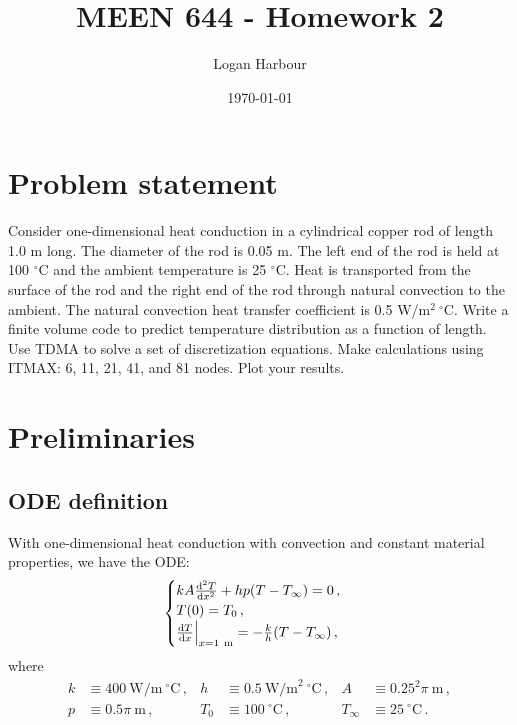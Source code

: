 \documentclass{article}
\newcommand{\pageTitle}{MEEN 644 - Homework 2}
\newcommand{\pageAuthor}{Logan Harbour}
\begin{document}
\title{\LARGE \textbf{\pageTitle} \vspace{-0.3cm}}
\author{\large \pageAuthor}
\date{\vspace{-0.6cm} \large \today \vspace{-0.4cm}}

\maketitle

\section*{Problem statement}

Consider one-dimensional heat conduction in a cylindrical copper rod of length 1.0 m long. The diameter of the rod is 0.05 m. The left end of the rod is held at 100 $^\circ$C and the ambient temperature is 25 $^\circ$C. Heat is transported from the surface of the rod and the right end of the rod through natural convection to the ambient. The natural convection heat transfer coefficient is 0.5 W/m$^2~^\circ$C. Write a finite volume code to predict temperature distribution as a function of length. Use TDMA to solve a set of discretization equations. Make calculations using ITMAX: 6, 11, 21, 41, and 81 nodes. Plot your results.

\section*{Preliminaries}

\subsection*{ODE definition}

With one-dimensional heat conduction with convection and constant material properties, we have the ODE:
\begin{equation}
	\begin{cases}
		kA \dv{^2T}{x^2} + h p (T - T_\infty) = 0\,,\\
		T(0) = T_0\,,\\
		\dv{T}{x} \Big|_{x = 1~\text{m}} = - \frac{k}{h} (T - T_\infty)\,,
	\end{cases}
\end{equation}
where
\begin{align*}
	k & \equiv 400~\text{W/m}~^\circ\text{C}\,, & h & \equiv 0.5~\text{W/m}^2~^\circ\text{C}\,, & A & \equiv 0.25^2 \pi~\text{m}\,,\\
	p & \equiv 0.5 \pi~\text{m}\,, & T_0 & \equiv 100~^\circ\text{C}\,, & T_\infty & \equiv 25~^\circ\text{C}\,.\\ 
\end{align*}
\end{document}
